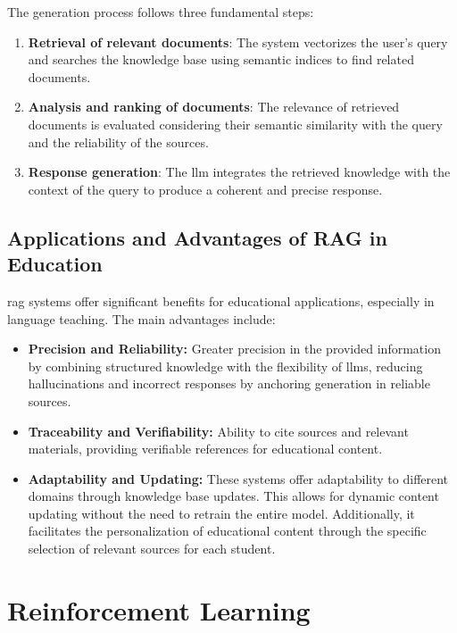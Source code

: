 The generation process follows three fundamental steps:

\begin{enumerate}
  \item \textbf{Retrieval of relevant documents}: The system vectorizes the user's query and searches the knowledge base using semantic indices to find related documents.

  \item \textbf{Analysis and ranking of documents}: The relevance of retrieved documents is evaluated considering their semantic similarity with the query and the reliability of the sources.

  \item \textbf{Response generation}: The \gls{llm} integrates the retrieved knowledge with the context of the query to produce a coherent and precise response.
\end{enumerate}

\subsection{Applications and Advantages of RAG in Education}

\gls{rag} systems offer significant benefits for educational applications, especially in language teaching. The main advantages include:

\begin{itemize}
  \item \textbf{Precision and Reliability:} Greater precision in the provided information by combining structured knowledge with the flexibility of \gls{llm}s, reducing \gls{hallucinations} and incorrect responses by anchoring generation in reliable sources.

  \item \textbf{Traceability and Verifiability:} Ability to cite sources and relevant materials, providing verifiable references for educational content.

  \item \textbf{Adaptability and Updating:} These systems offer adaptability to different domains through knowledge base updates. This allows for dynamic content updating without the need to retrain the entire model. Additionally, it facilitates the personalization of educational content through the specific selection of relevant sources for each student.
\end{itemize}

\section{Reinforcement Learning}

